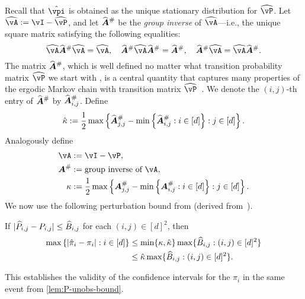 Recall that $\hat\vpi$ is obtained as the unique stationary
distribution for $\wh\vP$.
Let $\wh\vA := \vI - \wh\vP$, and let $\giAh$ be the \emph{group
inverse} of $\wh\vA$---i.e., the unique square matrix satisfying the
following equalities:
\[
  \wh\vA\giAh\wh\vA = \wh\vA , \quad
  \giAh\wh\vA\giAh = \giAh , \quad
  \giAh\wh\vA = \wh\vA\giAh .
\]
The matrix $\giAh$, which is well defined no matter what transition probability matrix $\wh\vP$ we start with 
\citep{meyer1975role},
 is a central quantity that captures many properties
of the ergodic Markov chain with transition matrix
$\wh\vP$~\citep{meyer1975role}.
We denote the $(i,j)$-th entry of $\giAh$ by $\giAh_{i,j}$.
Define
\begin{equation}
  \hat\kappa :=
  \frac12
  \max
  \Braces{
    \giAh_{j,j}
    - \min\Braces{ \giAh_{i,j} : i \in [d] }
    : j \in [d]
  } 
  .
  \notag
\end{equation}
Analogously define
\begin{align*}
  \vA & := \vI - \vP , \\
  \giA & := \text{group inverse of $\vA$} , \\
  \kappa & :=
  \frac12
  \max
  \Braces{
    \giA_{j,j}
    - \min\Braces{ \giA_{i,j} : i \in [d] }
    : j \in [d]
  } 
  .
\end{align*}
We now use the following perturbation bound from \citep[Section
3.3]{cho2001comparison} (derived
from~\citet{haviv1984perturbation,kirkland1998applications}).
\begin{lemma}
  \label{lem:pi-perturb}
  If
  $|\widehat{P}_{i,j} - P_{i,j}| \leq \widehat{B}_{i,j}$ for each $(i,j) \in
  [d]^2$, then
  \begin{align}
    \max\left\{
      |\hat\pi_i - \pi_i|
      : i \in [d]
    \right\}
    & \leq \min\{\kappa,\hat\kappa\} \max
    \{
      \widehat{B}_{i,j}
      : (i,j) \in [d]^2
    \}
    \notag \\
    & \leq \hat\kappa \max
    \{
      \widehat{B}_{i,j}
      : (i,j) \in [d]^2
    \}
    .
    \notag
  \end{align}
\end{lemma}
This establishes the validity of the confidence intervals for the
$\pi_i$ in the same event from \cref{lem:P-unobs-bound}.

